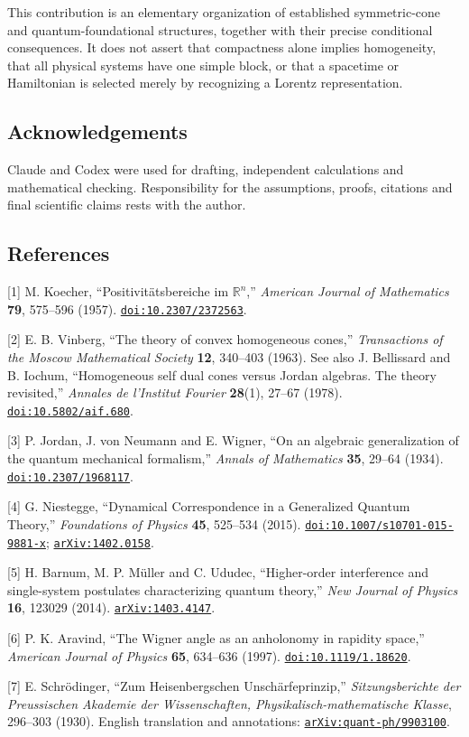 \documentclass[
  11pt,
  a4paper,
]{article}
\begin{document}
This contribution is an elementary organization of established symmetric-cone and quantum-foundational structures, together with their precise conditional consequences. It does not assert that compactness alone implies homogeneity, that all physical systems have one simple block, or that a spacetime or Hamiltonian is selected merely by recognizing a Lorentz representation.

\subsection{Acknowledgements}\label{acknowledgements}

Claude and Codex were used for drafting, independent calculations and mathematical checking. Responsibility for the assumptions, proofs, citations and final scientific claims rests with the author.

\subsection{References}\label{references}

{[}1{]} M. Koecher, ``Positivitätsbereiche im \(\mathbb R^n\),'' \emph{American Journal of Mathematics} \textbf{79}, 575--596 (1957). \href{https://doi.org/10.2307/2372563}{\nolinkurl{doi:10.2307/2372563}}.

{[}2{]} E. B. Vinberg, ``The theory of convex homogeneous cones,'' \emph{Transactions of the Moscow Mathematical Society} \textbf{12}, 340--403 (1963). See also J. Bellissard and B. Iochum, ``Homogeneous self dual cones versus Jordan algebras. The theory revisited,'' \emph{Annales de l'Institut Fourier} \textbf{28}(1), 27--67 (1978). \href{https://doi.org/10.5802/aif.680}{\nolinkurl{doi:10.5802/aif.680}}.

{[}3{]} P. Jordan, J. von Neumann and E. Wigner, ``On an algebraic generalization of the quantum mechanical formalism,'' \emph{Annals of Mathematics} \textbf{35}, 29--64 (1934). \href{https://doi.org/10.2307/1968117}{\nolinkurl{doi:10.2307/1968117}}.

{[}4{]} G. Niestegge, ``Dynamical Correspondence in a Generalized Quantum Theory,'' \emph{Foundations of Physics} \textbf{45}, 525--534 (2015). \href{https://doi.org/10.1007/s10701-015-9881-x}{\nolinkurl{doi:10.1007/s10701-015-9881-x}}; \href{https://arxiv.org/abs/1402.0158}{\nolinkurl{arXiv:1402.0158}}.

{[}5{]} H. Barnum, M. P. Müller and C. Ududec, ``Higher-order interference and single-system postulates characterizing quantum theory,'' \emph{New Journal of Physics} \textbf{16}, 123029 (2014). \href{https://arxiv.org/abs/1403.4147}{\nolinkurl{arXiv:1403.4147}}.

{[}6{]} P. K. Aravind, ``The Wigner angle as an anholonomy in rapidity space,'' \emph{American Journal of Physics} \textbf{65}, 634--636 (1997). \href{https://doi.org/10.1119/1.18620}{\nolinkurl{doi:10.1119/1.18620}}.

{[}7{]} E. Schrödinger, ``Zum Heisenbergschen Unschärfeprinzip,'' \emph{Sitzungsberichte der Preussischen Akademie der Wissenschaften, Physikalisch-mathematische Klasse}, 296--303 (1930). English translation and annotations: \href{https://arxiv.org/abs/quant-ph/9903100}{\nolinkurl{arXiv:quant-ph/9903100}}.
\end{document}
